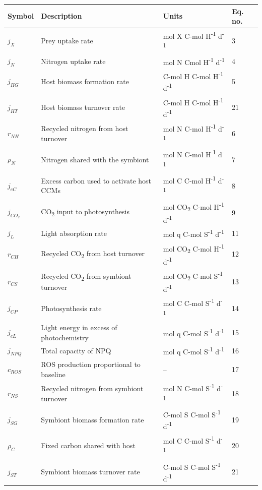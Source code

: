 \documentclass[]{elsarticle} %
\begin{document}
\begin{longtable}[]{@{}llll@{}}
\toprule
Symbol & Description & Units & Eq. no.\tabularnewline
\midrule
\endhead
\(j_X\) & Prey uptake rate & mol X C-mol H\textsuperscript{-1}
d\textsuperscript{-1} & 3\tabularnewline
\(j_N\) & Nitrogen uptake rate & mol N Cmol H\textsuperscript{-1}
d\textsuperscript{-1} & 4\tabularnewline
\(j_{HG}\) & Host biomass formation rate & C-mol H C-mol
H\textsuperscript{-1} d\textsuperscript{-1} & 5\tabularnewline
\(j_{HT}\) & Host biomass turnover rate & C-mol H C-mol
H\textsuperscript{-1} d\textsuperscript{-1} & 21\tabularnewline
\(r_{NH}\) & Recycled nitrogen from host turnover & mol N C-mol
H\textsuperscript{-1} d\textsuperscript{-1} & 6\tabularnewline
\(\rho_N\) & Nitrogen shared with the symbiont & mol N C-mol
H\textsuperscript{-1} d\textsuperscript{-1} & 7\tabularnewline
\(j_{eC}\) & Excess carbon used to activate host CCMs & mol C C-mol
H\textsuperscript{-1} d\textsuperscript{-1} & 8\tabularnewline
\(j_{CO_2}\) & CO\textsubscript{2} input to photosynthesis & mol
CO\textsubscript{2} C-mol H\textsuperscript{-1} d\textsuperscript{-1} &
9\tabularnewline
\(j_L\) & Light absorption rate & mol q C-mol S\textsuperscript{-1}
d\textsuperscript{-1} & 11\tabularnewline
\(r_{CH}\) & Recycled CO\textsubscript{2} from host turnover & mol
CO\textsubscript{2} C-mol H\textsuperscript{-1} d\textsuperscript{-1} &
12\tabularnewline
\(r_{CS}\) & Recycled CO\textsubscript{2} from symbiont turnover & mol
CO\textsubscript{2} C-mol S\textsuperscript{-1} d\textsuperscript{-1} &
13\tabularnewline
\(j_{CP}\) & Photosynthesis rate & mol C C-mol S\textsuperscript{-1}
d\textsuperscript{-1} & 14\tabularnewline
\(j_{eL}\) & Light energy in excess of photochemistry & mol q C-mol
S\textsuperscript{-1} d\textsuperscript{-1} & 15\tabularnewline
\(j_{NPQ}\) & Total capacity of NPQ & mol q C-mol S\textsuperscript{-1}
d\textsuperscript{-1} & 16\tabularnewline
\(c_{ROS}\) & ROS production proportional to baseline & -- &
17\tabularnewline
\(r_{NS}\) & Recycled nitrogen from symbiont turnover & mol N C-mol
S\textsuperscript{-1} d\textsuperscript{-1} & 18\tabularnewline
\(j_{SG}\) & Symbiont biomass formation rate & C-mol S C-mol
S\textsuperscript{-1} d\textsuperscript{-1} & 19\tabularnewline
\(\rho_C\) & Fixed carbon shared with host & mol C C-mol
S\textsuperscript{-1} d\textsuperscript{-1} & 20\tabularnewline
\(j_{ST}\) & Symbiont biomass turnover rate & C-mol S C-mol
S\textsuperscript{-1} d\textsuperscript{-1} & 21\tabularnewline
\bottomrule
\end{longtable}
\end{document}
